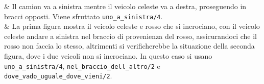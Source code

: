 \begin{center}
\begin{longtabu}
		 & Il camion va a sinistra mentre il veicolo celeste va a destra, proseguendo in bracci opposti. Viene sfruttato \texttt{uno\_a\_sinistra/4}. \\
		
		 & La prima figura mostra il veicolo celeste e rosso che si incrociano, con il veicolo celeste andare a sinistra nel braccio di provenienza del rosso, assicurandoci che il rosso non faccia lo stesso, altrimenti si verificherebbe la situazione della seconda figura, dove i due veicoli non si incrociano. In questo caso si usano \texttt{uno\_a\_sinistra/4}, \texttt{nel\_braccio\_dell\_altro/2} e \texttt{dove\_vado\_uguale\_dove\_vieni/2}.	
	\end{longtabu}
\end{center}


